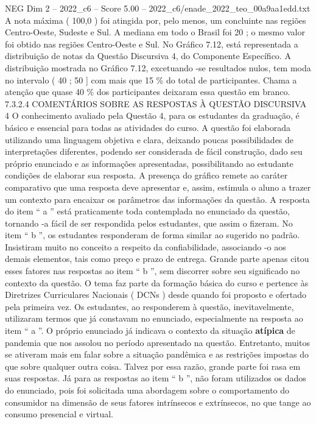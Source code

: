 \begin{textsample}{NEG Dim 2 – 2022\_c6 – Score 5.00 – 2022\_c6/enade\_2022\_teo\_00a9aa1edd.txt}
A nota máxima ( 100,0 ) foi atingida por, pelo menos, um concluinte nas regiões Centro-Oeste, Sudeste e Sul.
A mediana em todo o Brasil foi 20 ; o mesmo valor foi obtido nas regiões Centro-Oeste e Sul.
No Gráfico 7.12, está representada a distribuição de notas da Questão Discursiva 4, do Componente Específico.
A distribuição mostrada no Gráfico 7.12, excetuando -se resultados nulos, tem moda no intervalo ( 40 ; 50 ] com mais que 15 \% do total de participantes.
Chama a atenção que quase 40 \% dos participantes deixaram essa questão em branco. 7.3.2.4 COMENTÁRIOS SOBRE AS RESPOSTAS À QUESTÃO DISCURSIVA 4 O conhecimento avaliado pela Questão 4, para os estudantes da graduação, é básico e essencial para todas as atividades do curso.
A questão foi elaborada utilizando uma linguagem objetiva e clara, deixando poucas possibilidades de interpretações diferentes, podendo ser considerada de fácil construção, dado seu próprio enunciado e as informações apresentadas, possibilitando ao estudante condições de elaborar sua resposta.
A presença do gráfico remete ao caráter comparativo que uma resposta deve apresentar e, assim, estimula o aluno a trazer um contexto para encaixar os parâmetros das informações da questão.
A resposta do item “ a ” está praticamente toda contemplada no enunciado da questão, tornando -a fácil de ser respondida pelos estudantes, que assim o fizeram.
No item “ b ”, os estudantes responderam de forma similar ao sugerido no padrão.
Insistiram muito no conceito a respeito da confiabilidade, associando -o aos demais elementos, tais como preço e prazo de entrega.
Grande parte apenas citou esses fatores nas respostas ao item “ b ”, sem discorrer sobre seu significado no contexto da questão.
O tema faz parte da formação básica do curso e pertence às Diretrizes Curriculares Nacionais ( DCNs ) desde quando foi proposto e ofertado pela primeira vez.
Os estudantes, ao responderem à questão, inevitavelmente, utilizaram termos que já constavam no enunciado, especialmente na resposta ao item “ a ”.
O próprio enunciado já indicava o contexto da situação \textbf{atípica} de pandemia que nos assolou no período apresentado na questão.
Entretanto, muitos se ativeram mais em falar sobre a situação pandêmica e as restrições impostas do que sobre qualquer outra coisa.
Talvez por essa razão, grande parte foi rasa em suas respostas.
Já para as respostas ao item “ b ”, não foram utilizados os dados do enunciado, pois foi solicitada uma abordagem sobre o comportamento do consumidor na dimensão de seus fatores intrínsecos e extrínsecos, no que tange ao consumo presencial e virtual.

\end{textsample}
